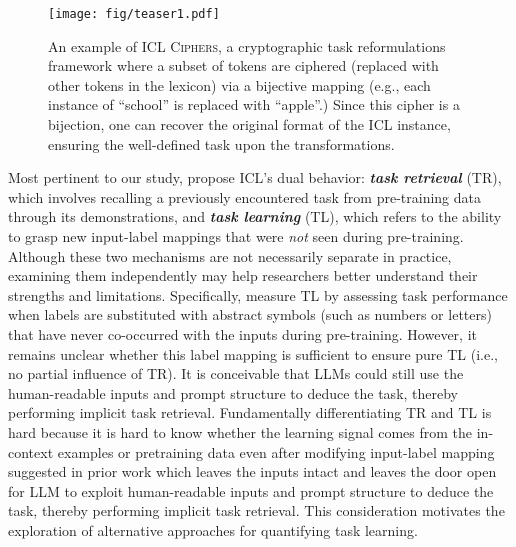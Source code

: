 \documentclass[11pt]{article}
\newcommand{\name}{\textsc{ICL Ciphers}}
\begin{document}
\begin{figure}[t]
\texttt{[image: fig/teaser1.pdf]}
\caption{
An example of \name, a cryptographic task reformulations framework where a subset of tokens are ciphered (replaced with other tokens in the lexicon) via a bijective mapping (e.g., each instance of ``school''  is replaced with ``apple''.)
Since this cipher is a bijection, one can recover the original format of the ICL instance, ensuring the well-defined task upon the transformations.
}
\label{fig:pipeline}
\end{figure}

Most pertinent to our study, \citet{pan2023incontext,lin2024dual,wang2024investigating} propose ICL's dual behavior: \textbf{\emph{task retrieval}} (TR), which involves recalling a previously encountered task from pre-training data through its demonstrations, and \textbf{\emph{task learning}} (TL), which refers to the ability to grasp new input-label mappings that were \emph{not} seen during pre-training. Although these two mechanisms are not necessarily separate in practice, examining them independently may help researchers better understand their strengths and limitations. Specifically, \citet{pan2023incontext} measure TL by assessing task performance when labels are substituted with abstract symbols (such as numbers or letters) that have never co-occurred with the inputs during pre-training. However, it remains unclear whether this label mapping is sufficient to ensure pure TL (i.e., no partial influence of TR).
It is conceivable that LLMs could still use the human-readable inputs and prompt structure to deduce the task, thereby performing implicit task retrieval.
Fundamentally differentiating TR and TL is hard because it is hard to know whether the learning signal comes from the in-context examples or pretraining data even after modifying input-label mapping suggested in prior work which leaves the inputs intact and leaves the door open for LLM to exploit human-readable inputs and prompt structure to deduce the task, thereby performing implicit task retrieval.
This consideration motivates the exploration of alternative approaches for quantifying task learning.
\end{document}
